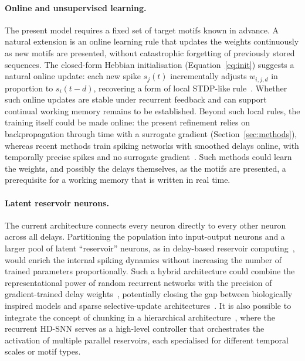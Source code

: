 \documentclass{scrartcl}
\newcommand{\citep}[1]{\parencite{#1}}
\begin{document}
\paragraph{Online and unsupervised learning.}
The present model requires a fixed set of target motifs known in advance. A natural extension is an online learning rule that updates the weights continuously as new motifs are presented, without catastrophic forgetting of previously stored sequences. The closed-form Hebbian initialisation (Equation~\ref{eq:init}) suggests a natural online update: each new spike $s_j(t)$ incrementally adjusts $w_{i, j, d}$ in proportion to $s_i(t-d)$, recovering a form of local STDP-like rule~\citep{Izhikevich2006}. Whether such online updates are stable under recurrent feedback and can support continual working memory remains to be established. Beyond such local rules, the training itself could be made online: the present refinement relies on backpropagation through time with a surrogate gradient (Section~\ref{sec:methods}), whereas recent methods train spiking networks with smoothed delays online, with temporally precise spikes and no surrogate gradient~\citep{Koopman2026}. Such methods could learn the weights, and possibly the delays themselves, as the motifs are presented, a prerequisite for a working memory that is written in real time.

\paragraph{Latent reservoir neurons.}
The current architecture connects every neuron directly to every other neuron across all delays. Partitioning the population into input-output neurons and a larger pool of latent ``reservoir'' neurons, as in delay-based reservoir computing~\citep{Paugam-Moisy2008}, would enrich the internal spiking dynamics without increasing the number of trained parameters proportionally. Such a hybrid architecture could combine the representational power of random recurrent networks with the precision of gradient-trained delay weights~\citep{Neftci2019a}, potentially closing the gap between biologically inspired models and sparse selective-update architectures~\citep{Yin2026}. It is also possible to integrate the concept of chunking in a hierarchical architecture~\citep{Zhong2026}, where the recurrent HD-SNN serves as a high-level controller that orchestrates the activation of multiple parallel reservoirs, each specialised for different temporal scales or motif types.
\end{document}
